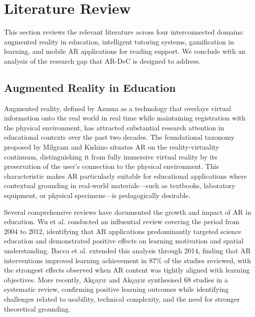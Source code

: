
\section{Literature Review}
\label{sec:literature}

This section reviews the relevant literature across four interconnected domains: augmented reality in education, intelligent tutoring systems, gamification in learning, and mobile AR applications for reading support. We conclude with an analysis of the research gap that AR-DeC is designed to address.

\subsection{Augmented Reality in Education}
\label{subsec:ar_education}

Augmented reality, defined by Azuma \cite{azuma1997} as a technology that overlays virtual information onto the real world in real time while maintaining registration with the physical environment, has attracted substantial research attention in educational contexts over the past two decades. The foundational taxonomy proposed by Milgram and Kishino \cite{milgram1994} situates AR on the reality-virtuality continuum, distinguishing it from fully immersive virtual reality by its preservation of the user's connection to the physical environment. This characteristic makes AR particularly suitable for educational applications where contextual grounding in real-world materials---such as textbooks, laboratory equipment, or physical specimens---is pedagogically desirable.

Several comprehensive reviews have documented the growth and impact of AR in education. Wu et al. \cite{wu2013} conducted an influential review covering the period from 2004 to 2012, identifying that AR applications predominantly targeted science education and demonstrated positive effects on learning motivation and spatial understanding. Bacca et al. \cite{bacca2014} extended this analysis through 2014, finding that AR interventions improved learning achievement in 87\% of the studies reviewed, with the strongest effects observed when AR content was tightly aligned with learning objectives. More recently, Ak\c{c}ay{\i}r and Ak\c{c}ay{\i}r \cite{akccayir2017} synthesised 68 studies in a systematic review, confirming positive learning outcomes while identifying challenges related to usability, technical complexity, and the need for stronger theoretical grounding.

